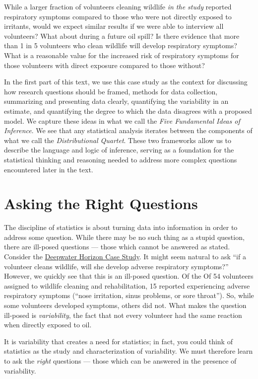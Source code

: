 \documentclass[]{book}
\theoremstyle{definition}
\theoremstyle{definition}
\theoremstyle{remark}
\begin{document}
While a larger fraction of volunteers cleaning wildlife \emph{in the
study} reported respiratory symptoms compared to those who were not
directly exposed to irritants, would we expect similar results if we
were able to interview all volunteers? What about during a future oil
spill? Is there evidence that more than 1 in 5 volunteers who clean
wildlife will develop respiratory symptoms? What is a reasonable value
for the increased risk of respiratory symptoms for those volunteers with
direct exposure compared to those without?

In the first part of this text, we use this case study as the context
for discussing how research questions should be framed, methods for data
collection, summarizing and presenting data clearly, quantifying the
variability in an estimate, and quantifying the degree to which the data
disagrees with a proposed model. We capture these ideas in what we call
the \emph{Five Fundamental Ideas of Inference}. We see that any
statistical analysis iterates between the components of what we call the
\emph{Distributional Quartet}. These two frameworks allow us to describe
the language and logic of inference, serving as a foundation for the
statistical thinking and reasoning needed to address more complex
questions encountered later in the text.

\chapter{Asking the Right Questions}\label{Questions}

The discipline of statistics is about turning data into information in
order to address some question. While there may be no such thing as a
stupid question, there are ill-posed questions --- those which cannot be
answered as stated. Consider the
\protect\hyperlink{CaseDeepwater}{Deepwater Horizon Case Study}. It
might seem natural to ask ``if a volunteer cleans wildlife, will she
develop adverse respiratory symptoms?'' However, we quickly see that
this is an ill-posed question. Of the Of 54 volunteers assigned to
wildlife cleaning and rehabilitation, 15 reported experiencing adverse
respiratory symptoms (``nose irritation, sinus problems, or sore
throat''). So, while some volunteers developed symptoms, others did not.
What makes the question ill-posed is \emph{variability}, the fact that
not every volunteer had the same reaction when directly exposed to oil.

It is variability that creates a need for statistics; in fact, you could
think of statistics as the study and characterization of variability. We
must therefore learn to ask the \emph{right} questions --- those which
can be answered in the presence of variability.
\end{document}
